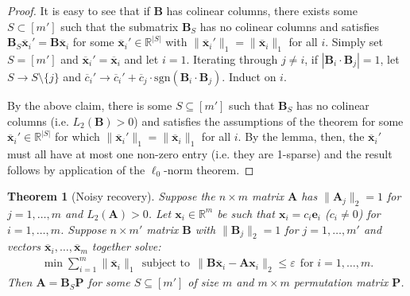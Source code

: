 \documentclass[journal, onecolumn]{IEEEtran}
\newtheorem{theorem}{Theorem}
\begin{document}
\begin{proof}
It is easy to see that if $\mathbf{B}$ has colinear columns, there exists some $S \subset [m']$ such that the submatrix $\mathbf{B}_S$ has no colinear columns and satisfies $\mathbf{B}_S \mathbf{\overline x}_i' = \mathbf{B} \mathbf{\overline x}_i$ for some $\mathbf{\overline x}_i' \in \mathbb{R}^{|S|}$ with $\|\mathbf{\overline x}_i'\|_1 = \|\mathbf{\overline x}_i\|_1$ for all $i$. Simply set $S = [m']$ and $\mathbf{\overline x}_i' = \mathbf{\overline x}_i$ and let $i=1$. Iterating through $j \neq i$, if $| \mathbf{B}_i \cdot \mathbf{B}_j| = 1$, let $S \to S \setminus \{j\}$ and $\overline c_i' \to \overline c_i' + \overline c_j \cdot \text{sgn}(\mathbf{B}_i \cdot \mathbf{B}_j)$. Induct on $i$. 

By the above claim, there is some $S \subseteq [m']$ such that $\mathbf{B}_S$ has no colinear columns (i.e. $L_2(\mathbf{B}) > 0$) and satisfies the assumptions of the theorem for some $\mathbf{\overline x}_i' \in \mathbb{R}^{|S|}$ for which $\|\mathbf{\overline x}_i'\|_1 = \|\mathbf{\overline x}_i\|_1$ for all $i$. By the lemma, then, the $\mathbf{\overline x}_i'$ must all have at most one non-zero entry (i.e. they are 1-sparse) and the result follows by application of the $\ell_0$-norm theorem.

\end{proof}

\begin{theorem}[Noisy recovery]
Suppose the $n \times m$ matrix $\mathbf{A}$ has $\|\mathbf{A}_j\|_2 = 1$ for $j = 1, \ldots, m$ and $L_2(\mathbf{A}) > 0$. Let $\mathbf{x}_i \in \mathbb{R}^m$ be such that $\mathbf{x}_i = c_i \mathbf{e}_i$ ($c_i \neq 0$) for $i = 1, \ldots, m$. Suppose $n \times m'$ matrix $\mathbf{B}$ with $\|\mathbf{B}_j\|_2 = 1$ for $j = 1, \ldots, m'$ and vectors $\mathbf{\overline x}_i, \ldots, \mathbf{\overline x}_m$ together solve:
\begin{align}\label{minsum}
\min \sum_{i = 1}^m \|\mathbf{\overline x}_i\|_1 \ \
\text{subject to} \ \ \| \mathbf{B}\mathbf{\overline x}_i - \mathbf{Ax}_i \|_2 \leq \varepsilon \ \ \text{for $i = 1, \ldots, m$}.
\end{align}
Then $\mathbf{A} = \mathbf{B}_S \mathbf{P}$ for some $S \subseteq [m']$ of size $m$ and $m \times m$ permutation matrix $\mathbf{P}$.
\end{theorem}
\end{document}

